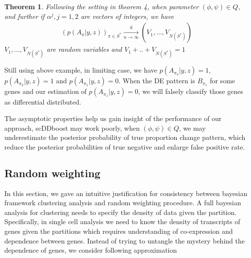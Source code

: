 \documentclass[aoas,preprint]{imsart}
\newtheorem{theorem}{Theorem}
\begin{document}
\begin{theorem} Following the setting in theorem 4, when parameter $(\phi, \psi)\in Q$,  and further if $\alpha^j, j = 1,2$ are vectors of integers, we have 
\begin{eqnarray*}
    (p(A_{\pi} | y, z))_{\pi\in S^*} \xrightarrow[n\rightarrow\infty]{\text{d}}%
                (V_1, ..., V_{N(S^*)})
\end{eqnarray*}
$V_1, ..., V_{N(S^*)}$ are random variables and $V_1 + .. + V_{N(S^*)} = 1$
\end{theorem} 

Still using above example, in limiting case, we have $p(A_{\pi_3} | y,z) = 1$, $p(A_{\pi_2} | y,z) = 1$ and $p(A_{\pi_1}| y,z) = 0$. When the DE pattern is $B_{\pi_1}$ for some genes and our estimation of $p(A_{\pi_1}| y,z) = 0$, we will falsely classify those genes as differential distributed.

The asymptotic properties help us gain insight of the performance of our approach,
scDDboost may work poorly, when $(\phi, \psi)\in Q$, we may underestimate the posterior probability of true proportion change pattern, which reduce the posterior probabilities of true negative and enlarge false positive rate.\\

\subsection{Random weighting}
In this section, we gave an intuitive justification for consistency between bayesian framework clustering analysis and random weighting procedure. A full bayesian analysis for clustering needs to specify the density of data given the partition. Specifically, in single cell analysis we need to know the density of transcripts of genes given the partitions which requires understanding of co-expression and dependence between genes. Instead of trying to untangle the mystery behind the dependence of genes, we consider following approximation 
\end{document}
